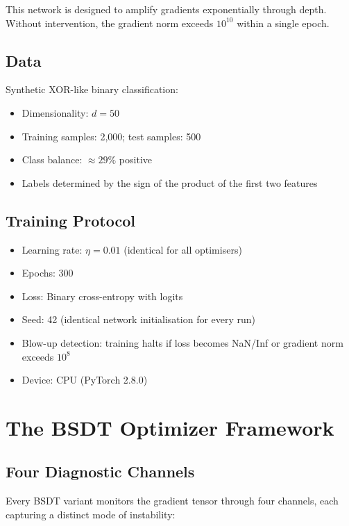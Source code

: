 \documentclass[11pt,a4paper]{article}
\begin{document}
This network is designed to amplify gradients exponentially through depth.
Without intervention, the gradient norm exceeds $10^{10}$ within a single
epoch.

\subsection{Data}

Synthetic XOR-like binary classification:
\begin{itemize}[nosep]
  \item Dimensionality: $d = 50$
  \item Training samples: 2,000; test samples: 500
  \item Class balance: $\approx 29\%$ positive
  \item Labels determined by the sign of the product of the first two features
\end{itemize}

\subsection{Training Protocol}

\begin{itemize}[nosep]
  \item Learning rate: $\eta = 0.01$ (identical for all optimisers)
  \item Epochs: 300
  \item Loss: Binary cross-entropy with logits
  \item Seed: 42 (identical network initialisation for every run)
  \item Blow-up detection: training halts if loss becomes NaN/Inf or gradient norm exceeds $10^{8}$
  \item Device: CPU (PyTorch 2.8.0)
\end{itemize}

\section{The BSDT Optimizer Framework}

\subsection{Four Diagnostic Channels}

Every BSDT variant monitors the gradient tensor through four channels, each
capturing a distinct mode of instability:
\end{document}
